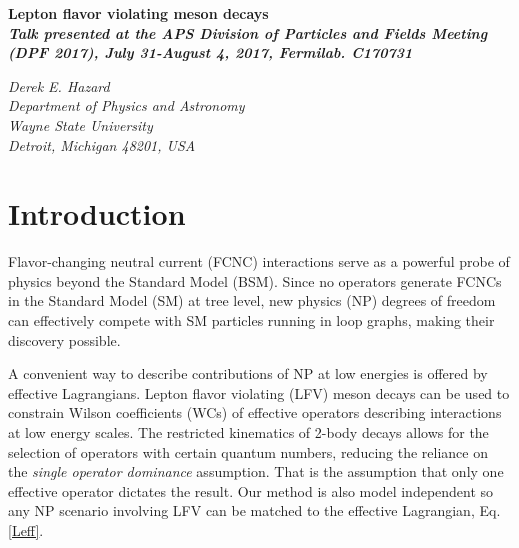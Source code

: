 \documentclass[12pt]{article}
\def\Title#1{\begin{center} {\Large {\bf #1} } \end{center}}
\begin{document}
\Title{Lepton flavor violating meson decays \\
{\small \textsl{Talk presented at the APS Division of Particles and Fields Meeting \\
(DPF 2017), July 31-August 4, 2017, Fermilab. C170731}}}

\bigskip\bigskip


\begin{raggedright}  

{\it Derek E. Hazard \\
Department of Physics and Astronomy\\
Wayne State University\\
Detroit, Michigan 48201, USA}
\bigskip\bigskip
\end{raggedright}

\begin{abstract}
We argue that lepton flavor violating (LFV) decays $M \to \ell_1 \overline \ell_2$ of meson states $M$ with 
different quantum numbers could be used to put constraints on the Wilson 
coefficients of effective operators describing LFV interactions at low energy scales. We note that the 
restricted kinematics of the two-body decay of quarkonium or a heavy quark meson allows us to select 
operators with particular quantum numbers, significantly reducing the reliance on the \textit{single operator 
dominance} assumption that is prevalent in constraining parameters of the effective LFV Lagrangian. We 
shall also argue that studies of radiative lepton flavor violating $M \to \gamma \ell_1 \overline \ell_2$ 
decays could provide important complementary access to those effective operators.
\end{abstract}

\section{Introduction}

Flavor-changing neutral current (FCNC) interactions serve as a powerful probe of physics beyond the Standard 
Model (BSM). Since no operators generate FCNCs in the Standard Model (SM) at tree level, new physics (NP) degrees of 
freedom can effectively compete with SM particles running in loop graphs, making their discovery possible.

A convenient way to describe contributions of NP at low energies is offered by effective Lagrangians. Lepton 
flavor violating (LFV) meson decays can be used to constrain Wilson coefficients (WCs) of effective operators
describing interactions at low energy scales.  The restricted kinematics of 2-body decays allows for the selection of operators with
certain quantum numbers, reducing the reliance on the \textit{single operator dominance} assumption.  That is the assumption that 
only one effective operator dictates the result.  Our method is also model independent so any NP scenario involving LFV 
can be matched to the effective Lagrangian, Eq. \ref{Leff}.
\end{document}

